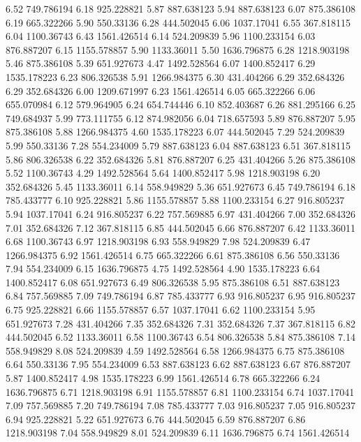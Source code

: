 6.52 	749.786194
6.18 	925.228821
5.87 	887.638123
5.94 	887.638123
6.07 	875.386108
6.19 	665.322266
5.90 	550.33136
6.28 	444.502045
6.06 	1037.17041
6.55 	367.818115
6.04 	1100.36743
6.43 	1561.426514
6.14 	524.209839
5.96 	1100.233154
6.03 	876.887207
6.15 	1155.578857
5.90 	1133.36011
5.50 	1636.796875
6.28 	1218.903198
5.46 	875.386108
5.39 	651.927673
4.47 	1492.528564
6.07 	1400.852417
6.29 	1535.178223
6.23 	806.326538
5.91 	1266.984375
6.30 	431.404266
6.29 	352.684326
6.29 	352.684326
6.00 	1209.671997
6.23 	1561.426514
6.05 	665.322266
6.06 	655.070984
6.12 	579.964905
6.24 	654.744446
6.10 	852.403687
6.26 	881.295166
6.25 	749.684937
5.99 	773.111755
6.12 	874.982056
6.04 	718.657593
5.89 	876.887207
5.95 	875.386108
5.88 	1266.984375
4.60 	1535.178223
6.07 	444.502045
7.29 	524.209839
5.99 	550.33136
7.28 	554.234009
5.79 	887.638123
6.04 	887.638123
6.51 	367.818115
5.86 	806.326538
6.22 	352.684326
5.81 	876.887207
6.25 	431.404266
5.26 	875.386108
5.52 	1100.36743
4.29 	1492.528564
5.64 	1400.852417
5.98 	1218.903198
6.20 	352.684326
5.45 	1133.36011
6.14 	558.949829
5.36 	651.927673
6.45 	749.786194
6.18 	785.433777
6.10 	925.228821
5.86 	1155.578857
5.88 	1100.233154
6.27 	916.805237
5.94 	1037.17041
6.24 	916.805237
6.22 	757.569885
6.97 	431.404266
7.00 	352.684326
7.01 	352.684326
7.12 	367.818115
6.85 	444.502045
6.66 	876.887207
6.42 	1133.36011
6.68 	1100.36743
6.97 	1218.903198
6.93 	558.949829
7.98 	524.209839
6.47 	1266.984375
6.92 	1561.426514
6.75 	665.322266
6.61 	875.386108
6.56 	550.33136
7.94 	554.234009
6.15 	1636.796875
4.75 	1492.528564
4.90 	1535.178223
6.64 	1400.852417
6.08 	651.927673
6.49 	806.326538
5.95 	875.386108
6.51 	887.638123
6.84 	757.569885
7.09 	749.786194
6.87 	785.433777
6.93 	916.805237
6.95 	916.805237
6.75 	925.228821
6.66 	1155.578857
6.57 	1037.17041
6.62 	1100.233154
5.95 	651.927673
7.28 	431.404266
7.35 	352.684326
7.31 	352.684326
7.37 	367.818115
6.82 	444.502045
6.52 	1133.36011
6.58 	1100.36743
6.54 	806.326538
5.84 	875.386108
7.14 	558.949829
8.08 	524.209839
4.59 	1492.528564
6.58 	1266.984375
6.75 	875.386108
6.64 	550.33136
7.95 	554.234009
6.53 	887.638123
6.62 	887.638123
6.67 	876.887207
5.87 	1400.852417
4.98 	1535.178223
6.99 	1561.426514
6.78 	665.322266
6.24 	1636.796875
6.71 	1218.903198
6.91 	1155.578857
6.81 	1100.233154
6.74 	1037.17041
7.09 	757.569885
7.20 	749.786194
7.08 	785.433777
7.03 	916.805237
7.05 	916.805237
6.94 	925.228821
5.22 	651.927673
6.76 	444.502045
6.59 	876.887207
6.86 	1218.903198
7.04 	558.949829
8.01 	524.209839
6.11 	1636.796875
6.74 	1561.426514
